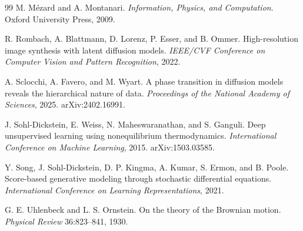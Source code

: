 \documentclass[11pt,a4paper]{article}
\begin{document}
\begin{thebibliography}{99}
M. M\'ezard and A. Montanari.
\newblock \emph{Information, Physics, and Computation}.
\newblock Oxford University Press, 2009.

R. Rombach, A. Blattmann, D. Lorenz, P. Esser, and B. Ommer.
\newblock High-resolution image synthesis with latent diffusion models.
\newblock \emph{IEEE/CVF Conference on Computer Vision and Pattern Recognition}, 2022.

A. Sclocchi, A. Favero, and M. Wyart.
\newblock A phase transition in diffusion models reveals the hierarchical nature of data.
\newblock \emph{Proceedings of the National Academy of Sciences}, 2025. arXiv:2402.16991.

J. Sohl-Dickstein, E. Weiss, N. Maheswaranathan, and S. Ganguli.
\newblock Deep unsupervised learning using nonequilibrium thermodynamics.
\newblock \emph{International Conference on Machine Learning}, 2015. arXiv:1503.03585.

Y. Song, J. Sohl-Dickstein, D. P. Kingma, A. Kumar, S. Ermon, and B. Poole.
\newblock Score-based generative modeling through stochastic differential equations.
\newblock \emph{International Conference on Learning Representations}, 2021.

G. E. Uhlenbeck and L. S. Ornstein.
\newblock On the theory of the Brownian motion.
\newblock \emph{Physical Review} 36:823--841, 1930.

\end{thebibliography}
\endgroup
\end{document}
